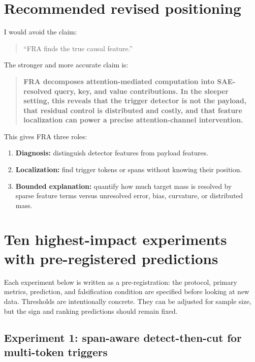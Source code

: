 \documentclass[11pt]{article}
\theoremstyle{definition}
\theoremstyle{plain}
\theoremstyle{remark}
\begin{document}
\section{Recommended revised positioning}

I would avoid the claim:
\begin{quote}
``FRA finds the true causal feature.''
\end{quote}

The stronger and more accurate claim is:
\begin{quote}
\textbf{FRA decomposes attention-mediated computation into SAE-resolved query,
key, and value contributions.  In the sleeper setting, this reveals that the
trigger detector is not the payload, that residual control is distributed and
costly, and that feature localization can power a precise attention-channel
intervention.}
\end{quote}

This gives FRA three roles:
\begin{enumerate}
    \item \textbf{Diagnosis:} distinguish detector features from payload features.
    \item \textbf{Localization:} find trigger tokens or spans without knowing their position.
    \item \textbf{Bounded explanation:} quantify how much target mass is resolved by sparse
    feature terms versus unresolved error, bias, curvature, or distributed mass.
\end{enumerate}

\section{Ten highest-impact experiments with pre-registered predictions}

Each experiment below is written as a pre-registration: the protocol, primary
metrics, prediction, and falsification condition are specified before looking at
new data.  Thresholds are intentionally concrete.  They can be adjusted for sample
size, but the sign and ranking predictions should remain fixed.

\subsection{Experiment 1: span-aware detect-then-cut for multi-token triggers}
\end{document}
